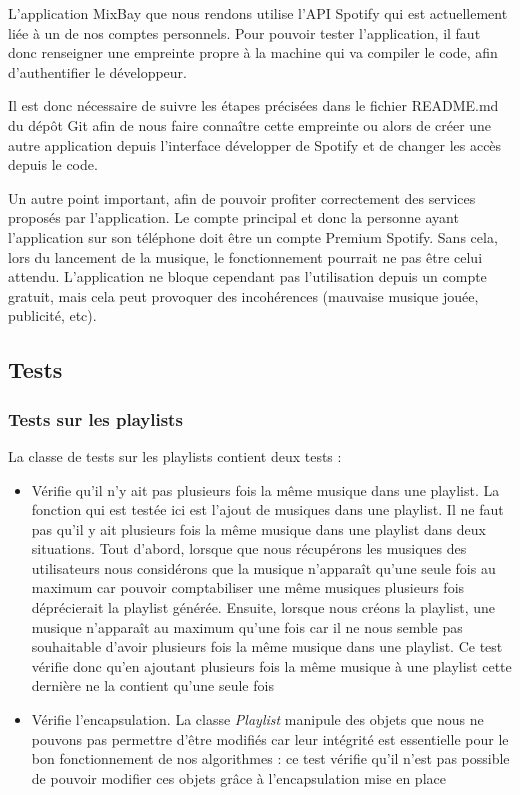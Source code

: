 \documentclass{article}
\begin{document}
		L'application MixBay que nous rendons utilise l'API Spotify qui est actuellement liée à un de nos comptes personnels. Pour pouvoir tester l'application, il faut donc renseigner une empreinte propre à la machine qui va compiler le code, afin d'authentifier le développeur.
		
		Il est donc nécessaire de suivre les étapes précisées dans le fichier README.md du dépôt Git afin de nous faire connaître cette empreinte ou alors de créer une autre application depuis l'interface développer de Spotify et de changer les accès depuis le code.
		
		Un autre point important, afin de pouvoir profiter correctement des services proposés par l'application. Le compte principal et donc la personne ayant l'application sur son téléphone doit être un compte Premium Spotify. Sans cela, lors du lancement de la musique, le fonctionnement pourrait ne pas être celui attendu. L'application ne bloque cependant pas l'utilisation depuis un compte gratuit, mais cela peut provoquer des incohérences (mauvaise musique jouée, publicité, etc).
		
		\subsection{Tests}
        \subsubsection{Tests sur les playlists}
        La classe de tests sur les playlists contient deux tests : 
        \begin{itemize}
            \item Vérifie qu'il n'y ait pas plusieurs fois la même musique dans une playlist. La fonction qui est testée ici est l'ajout de musiques dans une playlist. Il ne faut pas qu'il y ait plusieurs fois la même musique dans une playlist dans deux situations. Tout d'abord, lorsque que nous récupérons les musiques des utilisateurs nous considérons que la musique n'apparaît qu'une seule fois au maximum car pouvoir comptabiliser une même musiques plusieurs fois déprécierait la playlist générée. Ensuite, lorsque nous créons la playlist, une musique n'apparaît au maximum qu'une fois car il ne nous semble pas souhaitable d'avoir plusieurs fois la même musique dans une playlist. Ce test vérifie donc qu'en ajoutant plusieurs fois la même musique à une playlist cette dernière ne la contient qu'une seule fois
            \item Vérifie l'encapsulation. La classe \textit{Playlist} manipule des objets que nous ne pouvons pas permettre d'être modifiés car leur intégrité est essentielle pour le bon fonctionnement de nos algorithmes : ce test vérifie qu'il n'est pas possible de pouvoir modifier ces objets grâce à l'encapsulation mise en place
        \end{itemize}
                        
\end{document}
